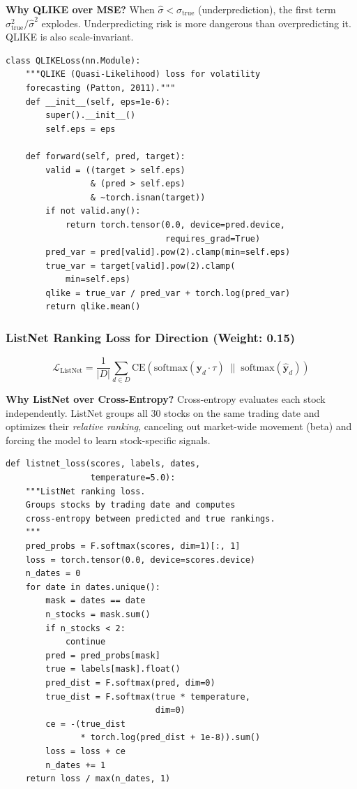 \textbf{Why QLIKE over MSE?} When $\hat{\sigma} < \sigma_{\text{true}}$ (underprediction), the first term $\sigma^2_{\text{true}}/\hat{\sigma}^2$ explodes. Underpredicting risk is more dangerous than overpredicting it. QLIKE is also scale-invariant.

\begin{lstlisting}[caption={QLIKE loss (src/models/losses.py)}]
class QLIKELoss(nn.Module):
    """QLIKE (Quasi-Likelihood) loss for volatility
    forecasting (Patton, 2011)."""
    def __init__(self, eps=1e-6):
        super().__init__()
        self.eps = eps

    def forward(self, pred, target):
        valid = ((target > self.eps)
                 & (pred > self.eps)
                 & ~torch.isnan(target))
        if not valid.any():
            return torch.tensor(0.0, device=pred.device,
                                requires_grad=True)
        pred_var = pred[valid].pow(2).clamp(min=self.eps)
        true_var = target[valid].pow(2).clamp(
            min=self.eps)
        qlike = true_var / pred_var + torch.log(pred_var)
        return qlike.mean()
\end{lstlisting}

\subsubsection{ListNet Ranking Loss for Direction (Weight: 0.15)}

\begin{equation}
    \mathcal{L}_{\text{ListNet}} = \frac{1}{|D|}\sum_{d \in D} \text{CE}\!\left(\text{softmax}(\mathbf{y}_d \cdot \tau) \;\big\|\; \text{softmax}(\hat{\mathbf{y}}_d)\right)
\end{equation}

\textbf{Why ListNet over Cross-Entropy?} Cross-entropy evaluates each stock independently. ListNet groups all 30 stocks on the same trading date and optimizes their \textit{relative ranking}, canceling out market-wide movement (beta) and forcing the model to learn stock-specific signals.

\begin{lstlisting}[caption={ListNet ranking loss (src/models/losses.py)}]
def listnet_loss(scores, labels, dates,
                 temperature=5.0):
    """ListNet ranking loss.
    Groups stocks by trading date and computes
    cross-entropy between predicted and true rankings.
    """
    pred_probs = F.softmax(scores, dim=1)[:, 1]
    loss = torch.tensor(0.0, device=scores.device)
    n_dates = 0
    for date in dates.unique():
        mask = dates == date
        n_stocks = mask.sum()
        if n_stocks < 2:
            continue
        pred = pred_probs[mask]
        true = labels[mask].float()
        pred_dist = F.softmax(pred, dim=0)
        true_dist = F.softmax(true * temperature,
                              dim=0)
        ce = -(true_dist
               * torch.log(pred_dist + 1e-8)).sum()
        loss = loss + ce
        n_dates += 1
    return loss / max(n_dates, 1)
\end{lstlisting}

